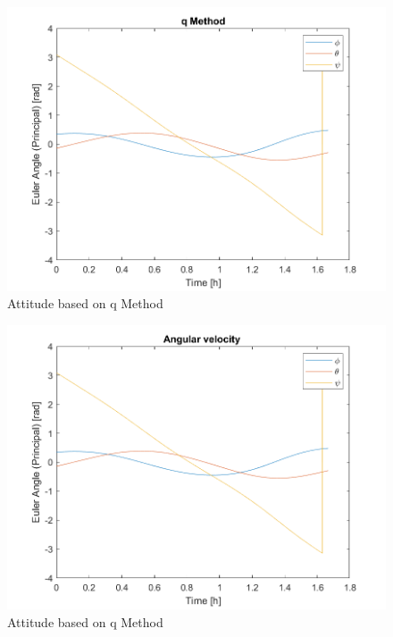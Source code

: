 \begin{figure}[H]
\centering
\includegraphics[scale=0.7]{Images/ps6_problem6_qMethod.png}
\caption{Attitude based on q Method}
\label{fig:Images/ps6_problem6_qMethod}
\end{figure}

\begin{figure}[H]
\centering
\includegraphics[scale=0.7]{Images/ps6_problem6_kins.png}
\caption{Attitude based on q Method}
\label{fig:Images/ps6_problem6_kins}
\end{figure}
